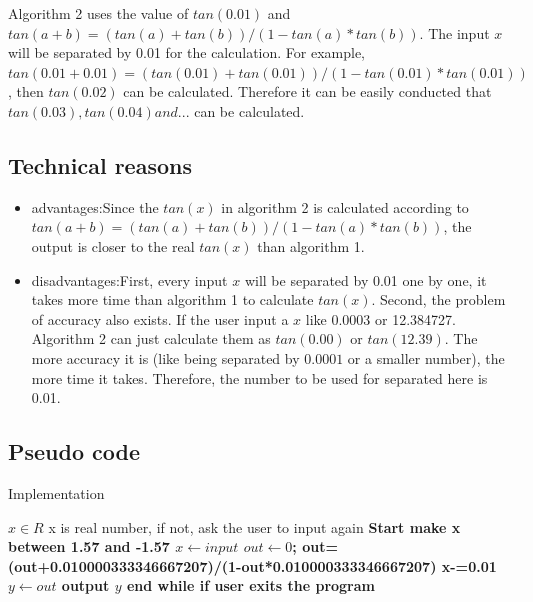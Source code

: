 \documentclass[10pt,a4paper,twoside]{article}
\begin{document}
Algorithm 2 uses the value of $tan(0.01)$ and $tan(a+b)=(tan(a)+tan(b))/(1-tan(a)*tan(b))$. The input $x$ will be separated by 0.01 for the calculation. For example, $tan(0.01+0.01)=(tan(0.01)+tan(0.01))/(1-tan(0.01)*tan(0.01))$, then $tan(0.02)$ can be calculated. Therefore it can be easily conducted that $tan(0.03), tan(0.04) and ...$ can be calculated.

\subsection{Technical reasons}

\begin{itemize}
    \item advantages:Since the $tan(x)$ in algorithm 2 is calculated according to $tan(a+b)=(tan(a)+tan(b))/(1-tan(a)*tan(b))$, the output is closer to the real $tan(x)$ than algorithm 1.
    \item disadvantages:First, every input $x$ will be separated by 0.01 one by one, it takes more time than algorithm 1 to calculate $tan(x)$. Second, the problem of accuracy also exists. If the user input a $x$ like 0.0003 or 12.384727. Algorithm 2 can just calculate them as $tan(0.00)$ or $tan(12.39)$. The more accuracy it is (like being separated by $0.0001$ or a smaller number), the more time it takes. Therefore, the number to be used for separated here is 0.01.
\end{itemize}

\subsection{Pseudo code}
\begin{algorithm}
\caption{Implementation}\label{alg:cap}
\begin{algorithmic}
\Require $x \in R$
\Ensure x is real number, if not, ask the user to input again
\State \bf{Start}
\State make x between 1.57 and -1.57
    \State $x \gets input$
    \State $out \gets 0$;
            \State out= (out+0.010000333346667207)/(1-out*0.010000333346667207)
            \State x-=0.01
        \EndWhile
    \State $y \gets out$
    \State \bf{output} $y$
\State end while if user exits the program
\EndWhile
\end{algorithmic}
\end{algorithm}




\end{document}
